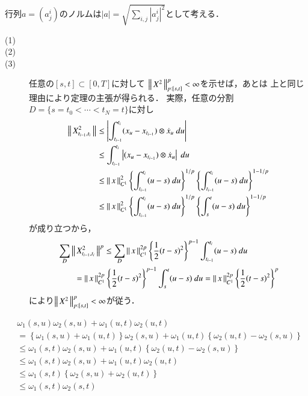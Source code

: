 	行列$a = (a_j^i)$のノルムは$|a| = \sqrt{\sum_{i,j}|a_j^i|^2}$として考える．
	
	\begin{thm}\mbox{}
		\begin{description}
			\item[(1)]
			\item[(2)] 
				
			\item[(3)] 任意の$[s,t] \subset [0,T]$に対して
				$\left\|\, X^2\, \right\|_{p:[s,t]}^p < \infty$を示せば，あとは
				上と同じ理由により定理の主張が得られる．
				実際，任意の分割$D = \{s=t_0 < \cdots < t_N = t\}$に対し
				\begin{align}
					\left\|\, X^2_{t_{i-1},t_i}\, \right\|_{}
					&\leq \left| \int_{t_{i-1}}^{t_i} (x_u - x_{t_{i-1}}) \otimes \dot{x}_u\ du \right| \\
					&\leq \int_{t_{i-1}}^{t_i} \left| (x_u - x_{t_{i-1}}) \otimes \dot{x}_u \right|\ du \\
					&\leq \left\|\, x\, \right\|_{C^1}^2 \left\{ \int_{t_{i-1}}^{t_i} (u-s)\ du \right\}^{1/p}
						\left\{ \int_{t_{i-1}}^{t_i} (u-s)\ du \right\}^{1-1/p} \\
					&\leq \left\|\, x\, \right\|_{C^1}^2 \left\{ \int_{t_{i-1}}^{t_i} (u-s)\ du \right\}^{1/p}
						\left\{ \int_s^t (u-s)\ du \right\}^{1-1/p}
				\end{align}
				が成り立つから，
				\begin{align}
					&\sum_D \left\|\, X^2_{t_{i-1},t_i}\, \right\|_{}^p
					\leq \sum_D \left\|\, x\, \right\|_{C^1}^{2p} \left\{ \frac{1}{2}(t-s)^2 \right\}^{p-1}
						\int_{t_{i-1}}^{t_i} (u-s)\ du \\
					&\qquad= \left\|\, x\, \right\|_{C^1}^{2p} \left\{ \frac{1}{2}(t-s)^2 \right\}^{p-1}
						\int_s^t (u-s)\ du
					= \left\|\, x\, \right\|_{C^1}^{2p} \left\{ \frac{1}{2}(t-s)^2 \right\}^p
				\end{align}
				により$\left\|\, X^2\, \right\|_{p:[s,t]}^p < \infty$が従う．
				\QED
		\end{description}
	\end{thm}
	
	\begin{prf}
		\begin{align}
			&\omega_1(s,u)\omega_2(s,u) + \omega_1(u,t)\omega_2(u,t) \\
			&= \left\{ \omega_1(s,u) + \omega_1(u,t) \right\}\omega_2(s,u) + \omega_1(u,t)\left\{\omega_2(u,t) - \omega_2(s,u)\right\} \\
			&\leq \omega_1(s,t)\omega_2(s,u) + \omega_1(u,t)\left\{\omega_2(u,t) - \omega_2(s,u)\right\} \\
			&\leq \omega_1(s,t)\omega_2(s,u) + \omega_1(u,t)\omega_2(u,t) \\
			&\leq \omega_1(s,t)\left\{ \omega_2(s,u) + \omega_2(u,t)\right\} \\
			&\leq \omega_1(s,t)\omega_2(s,t)
		\end{align}
	\end{prf}
	
